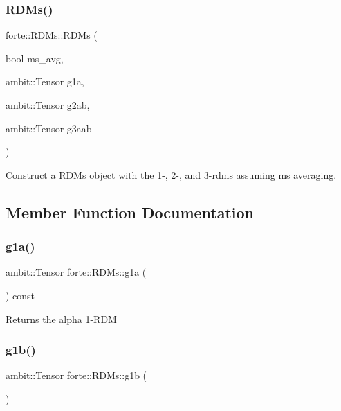 \subsubsection{\texorpdfstring{R\+D\+Ms()}{RDMs()}\hspace{0.1cm}{\footnotesize\ttfamily [7/7]}}
{\footnotesize\ttfamily forte\+::\+R\+D\+Ms\+::\+R\+D\+Ms (\begin{DoxyParamCaption}\item[{bool}]{ms\+\_\+avg,  }\item[{ambit\+::\+Tensor}]{g1a,  }\item[{ambit\+::\+Tensor}]{g2ab,  }\item[{ambit\+::\+Tensor}]{g3aab }\end{DoxyParamCaption})}



Construct a \mbox{\hyperlink{classforte_1_1_r_d_ms}{R\+D\+Ms}} object with the 1-\/, 2-\/, and 3-\/rdms assuming ms averaging. 



\subsection{Member Function Documentation}
\mbox{\label{classforte_1_1_r_d_ms_ace67ab047686bffaf52839a191068d07}} 
\subsubsection{\texorpdfstring{g1a()}{g1a()}}
{\footnotesize\ttfamily ambit\+::\+Tensor forte\+::\+R\+D\+Ms\+::g1a (\begin{DoxyParamCaption}{ }\end{DoxyParamCaption}) const\hspace{0.3cm}{\ttfamily [inline]}}

\begin{DoxyReturn}{Returns}
the alpha 1-\/\+R\+DM 
\end{DoxyReturn}
\mbox{\label{classforte_1_1_r_d_ms_aa71a38929b7b94762d51afd5fd796fa9}} 
\subsubsection{\texorpdfstring{g1b()}{g1b()}}
{\footnotesize\ttfamily ambit\+::\+Tensor forte\+::\+R\+D\+Ms\+::g1b (\begin{DoxyParamCaption}{ }\end{DoxyParamCaption})}

